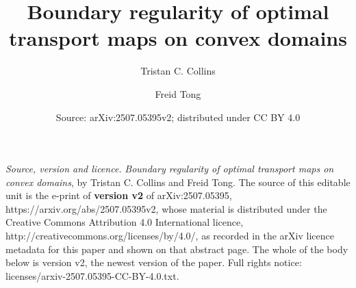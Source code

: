 \documentclass[10pt,a4paper]{amsart}
\numberwithin{equation}{section}
\begin{document}
\title{Boundary regularity of optimal transport maps on convex domains}
\author{Tristan C. Collins}
\author{Freid Tong}
\address{Department of Mathematics, University of Toronto, 40 St. George St., Toronto, Ontario, Canada}
\date{Source: arXiv:2507.05395v2; distributed under CC BY 4.0}
\maketitle
\noindent\emph{Source, version and licence.} \emph{Boundary regularity of optimal transport maps on convex domains}, by Tristan C. Collins and Freid Tong. The source of this editable unit is the e-print of \textbf{version v2} of arXiv:2507.05395, https://arxiv.org/abs/2507.05395v2, whose material is distributed under the Creative Commons Attribution 4.0 International licence, http://creativecommons.org/licenses/by/4.0/, as recorded in the arXiv licence metadata for this paper and shown on that abstract page. The whole of the body below is version v2, the newest version of the paper. Full rights notice: licenses/arxiv-2507.05395-CC-BY-4.0.txt.\par\smallskip
\end{document}
